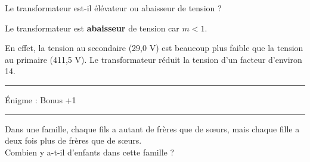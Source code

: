 \documentclass[11pt,a4paper]{article}
\begin{document}
 Le transformateur est-il élévateur ou abaisseur de tension ? 

\begin{tcolorbox}[colback=red!5!white,colframe=red!75!black]
Le transformateur est \textbf{abaisseur} de tension car $m < 1$.

\vspace{2mm}

En effet, la tension au secondaire (29,0 V) est beaucoup plus faible que la tension au primaire (411,5 V). Le transformateur réduit la tension d'un facteur d'environ 14.
\end{tcolorbox}

\vfill 

\hrule 
\begin{center}
   \Large{Énigme : Bonus +1} \\[5mm]
\end{center}



\hrule

  Dans une famille, chaque fils a autant de frères que de sœurs, mais chaque fille a deux fois plus de frères que de sœurs. \\[3mm]
  Combien y a-t-il d'enfants dans cette famille ?
\end{document}
